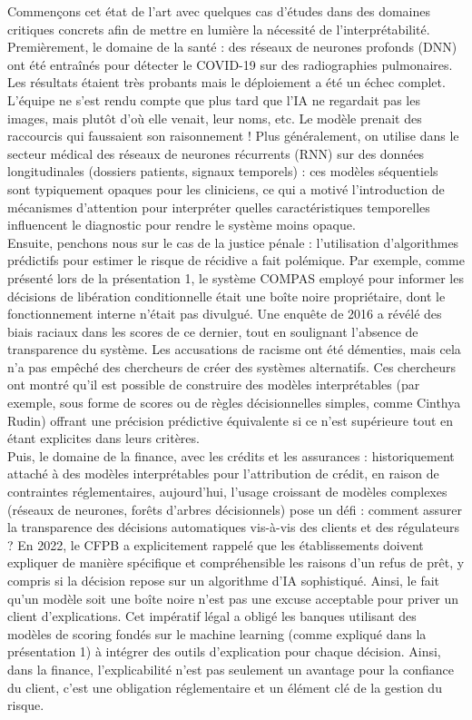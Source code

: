 \documentclass{article}
\begin{document}
\quad Commençons cet état de l’art avec quelques cas d'études dans des domaines critiques concrets afin de mettre en lumière la nécessité de l'interprétabilité.\\

Premièrement, le domaine de la santé : des réseaux de neurones profonds (DNN) ont été entraînés pour détecter le COVID-19 sur des radiographies pulmonaires. Les résultats étaient très probants mais le déploiement a été un échec complet. L'équipe ne s'est rendu compte que plus tard que l’IA ne regardait pas les images, mais plutôt d'où elle venait, leur noms, etc. Le modèle prenait des raccourcis qui faussaient son raisonnement ! Plus généralement, on utilise dans le secteur médical des réseaux de neurones récurrents (RNN) sur des données longitudinales (dossiers patients, signaux temporels) : ces modèles séquentiels sont typiquement opaques pour les cliniciens, ce qui a motivé l’introduction de mécanismes d’attention pour interpréter quelles caractéristiques temporelles influencent le diagnostic pour rendre le système moins opaque.\\

Ensuite, penchons nous sur le cas de la justice pénale : l’utilisation d’algorithmes prédictifs pour estimer le risque de récidive a fait polémique. Par exemple, comme présenté lors de la présentation 1, le système COMPAS employé pour informer les décisions de libération conditionnelle était une boîte noire propriétaire, dont le fonctionnement interne n’était pas divulgué. Une enquête de 2016 a révélé des biais raciaux dans les scores de ce dernier, tout en soulignant l’absence de transparence du système. Les accusations de racisme ont été démenties, mais cela n’a pas empêché des chercheurs de créer des systèmes alternatifs. Ces chercheurs ont montré qu’il est possible de construire des modèles interprétables (par exemple, sous forme de scores ou de règles décisionnelles simples, comme Cinthya Rudin) offrant une précision prédictive équivalente si ce n’est supérieure tout en étant explicites dans leurs critères.\\

Puis, le domaine de la finance, avec les crédits et les assurances : historiquement attaché à des modèles interprétables pour l’attribution de crédit, en raison de contraintes réglementaires, aujourd’hui, l’usage croissant de modèles complexes (réseaux de neurones, forêts d’arbres décisionnels) pose un défi : comment assurer la transparence des décisions automatiques vis-à-vis des clients et des régulateurs ? En 2022, le CFPB a explicitement rappelé que les établissements doivent expliquer de manière spécifique et compréhensible les raisons d’un refus de prêt, y compris si la décision repose sur un algorithme d’IA sophistiqué. Ainsi, le fait qu’un modèle soit une boîte noire n’est pas une excuse acceptable pour priver un client d’explications. Cet impératif légal a obligé les banques utilisant des modèles de scoring fondés sur le machine learning (comme expliqué dans la présentation 1) à intégrer des outils d’explication pour chaque décision. Ainsi, dans la finance, l’explicabilité n’est pas seulement un avantage pour la confiance du client, c’est une obligation réglementaire et un élément clé de la gestion du risque.\\
\end{document}
